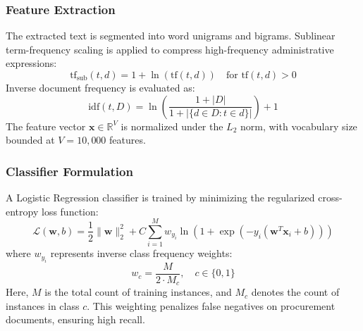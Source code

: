 \documentclass[conference]{IEEEtran}
\begin{document}
\subsubsection{Feature Extraction}
The extracted text is segmented into word unigrams and bigrams. Sublinear term-frequency scaling is applied to compress high-frequency administrative expressions:
\begin{equation}
    \text{tf}_{\text{sub}}(t, d) = 1 + \ln(\text{tf}(t, d)) \quad \text{for } \text{tf}(t, d) > 0
\end{equation}
Inverse document frequency is evaluated as:
\begin{equation}
    \text{idf}(t, D) = \ln \left( \frac{1 + |D|}{1 + |\{d \in D : t \in d\}|} \right) + 1
\end{equation}
The feature vector $\mathbf{x} \in \mathbb{R}^{V}$ is normalized under the $L_2$ norm, with vocabulary size bounded at $V = 10{,}000$ features.

\subsubsection{Classifier Formulation}
A Logistic Regression classifier is trained by minimizing the regularized cross-entropy loss function:
\begin{equation}
    \mathcal{L}(\mathbf{w}, b) = \frac{1}{2} \|\mathbf{w}\|_2^2 + C \sum_{i=1}^{M} w_{y_i} \ln(1 + \exp(-y_i (\mathbf{w}^T \mathbf{x}_i + b)))
\end{equation}
where $w_{y_i}$ represents inverse class frequency weights:
\begin{equation}
    w_c = \frac{M}{2 \cdot M_c}, \quad c \in \{0, 1\}
\end{equation}
Here, $M$ is the total count of training instances, and $M_c$ denotes the count of instances in class $c$. This weighting penalizes false negatives on procurement documents, ensuring high recall.
\end{document}
